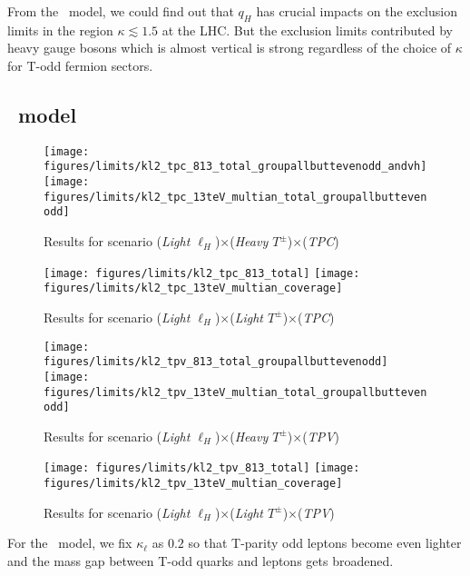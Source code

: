 From the \hq~model, we could find out that $q_H$ has crucial impacts on the exclusion limits in the region $\kappa \lesssim 1.5$ at the LHC.
But the exclusion limits contributed by heavy gauge bosons which is almost vertical is strong regardless of the choice of $\kappa$ for T-odd fermion sectors.
 
 

\subsection{\lil~model}
\begin{figure*}
\centering
\texttt{[image: figures/limits/kl2\_tpc\_813\_total\_groupallbuttevenodd\_andvh]} 
\texttt{[image: figures/limits/kl2\_tpc\_13teV\_multian\_total\_groupallbuttevenodd]}
\caption{Results for scenario (\emph{Light $\ell_H$})$\times$(\emph{Heavy $T^\pm$})$\times$(\emph{TPC})}
\label{fig:cmresults:lighttpcnotop}
\end{figure*}

\begin{figure*}
\texttt{[image: figures/limits/kl2\_tpc\_813\_total]} 
\texttt{[image: figures/limits/kl2\_tpc\_13teV\_multian\_coverage]}
\caption{Results for scenario (\emph{Light $\ell_H$})$\times$(\emph{Light $T^\pm$})$\times$(\emph{TPC})}
\label{fig:cmresults:lighttpctop}
\end{figure*}

\begin{figure*}
\centering
\texttt{[image: figures/limits/kl2\_tpv\_813\_total\_groupallbuttevenodd]} 
\texttt{[image: figures/limits/kl2\_tpv\_13teV\_multian\_total\_groupallbuttevenodd]}
\caption{Results for scenario (\emph{Light $\ell_H$})$\times$(\emph{Heavy $T^\pm$})$\times$(\emph{TPV})}
\label{fig:cmresults:lighttpvnotop}
\end{figure*}

\begin{figure*}
\texttt{[image: figures/limits/kl2\_tpv\_813\_total]} 
\texttt{[image: figures/limits/kl2\_tpv\_13teV\_multian\_coverage]}
\caption{Results for scenario (\emph{Light $\ell_H$})$\times$(\emph{Light $T^\pm$})$\times$(\emph{TPV})}
\label{fig:cmresults:lighttpvtop}
\end{figure*}
For the \lil~model, we fix $\kappa_\ell$ as $0.2$ so that T-parity odd leptons become even lighter and the mass gap between T-odd quarks and leptons gets broadened. 


